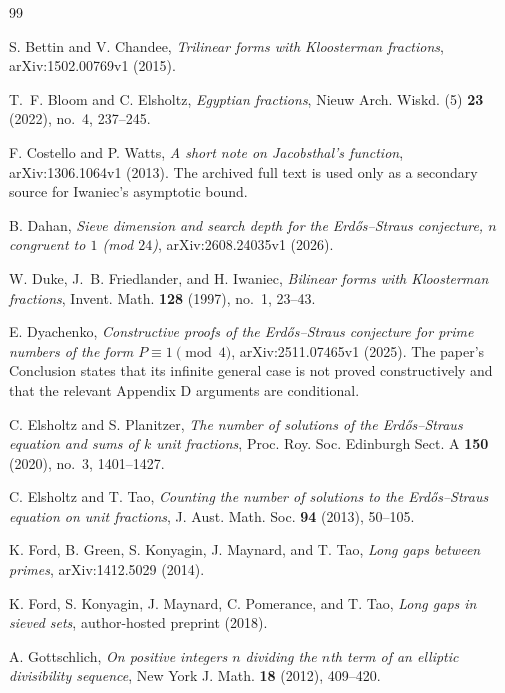 \documentclass[10pt,reqno]{amsart}
\theoremstyle{definition}
\newcommand{\1}{\mathbf 1}
\begin{document}
\begin{thebibliography}{99}
\scriptsize

S. Bettin and V. Chandee,
\emph{Trilinear forms with Kloosterman fractions},
arXiv:1502.00769v1 (2015).

T.~F. Bloom and C. Elsholtz,
\emph{Egyptian fractions},
Nieuw Arch. Wiskd. (5) \textbf{23} (2022), no.~4, 237--245.

F. Costello and P. Watts,
\emph{A short note on Jacobsthal's function},
arXiv:1306.1064v1 (2013).  The archived full text is used only as a
secondary source for Iwaniec's asymptotic bound.

B. Dahan,
\emph{Sieve dimension and search depth for the Erd\H{o}s--Straus conjecture,
$n$ congruent to $1$ (mod $24$)},
arXiv:2608.24035v1 (2026).

W. Duke, J.~B. Friedlander, and H. Iwaniec,
\emph{Bilinear forms with Kloosterman fractions},
Invent. Math. \textbf{128} (1997), no.~1, 23--43.

E. Dyachenko,
\emph{Constructive proofs of the Erd\H{o}s--Straus conjecture for prime
numbers of the form $P\equiv1\pmod4$},
arXiv:2511.07465v1 (2025).  The paper's Conclusion states that its infinite
general case is not proved constructively and that the relevant Appendix D
arguments are conditional.

C. Elsholtz and S. Planitzer,
\emph{The number of solutions of the Erd\H{o}s--Straus equation and sums of $k$ unit fractions},
Proc. Roy. Soc. Edinburgh Sect. A \textbf{150} (2020), no.~3, 1401--1427.

C. Elsholtz and T. Tao,
\emph{Counting the number of solutions to the Erd\H{o}s--Straus equation on unit fractions},
J. Aust. Math. Soc. \textbf{94} (2013), 50--105.

K. Ford, B. Green, S. Konyagin, J. Maynard, and T. Tao,
\emph{Long gaps between primes},
arXiv:1412.5029 (2014).

K. Ford, S. Konyagin, J. Maynard, C. Pomerance, and T. Tao,
\emph{Long gaps in sieved sets},
author-hosted preprint (2018).

A. Gottschlich,
\emph{On positive integers $n$ dividing the $n$th term of an elliptic
divisibility sequence},
New York J. Math. \textbf{18} (2012), 409--420.


\end{thebibliography}
\end{document}
